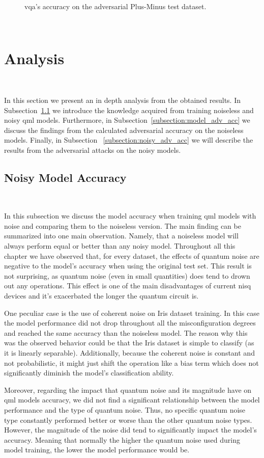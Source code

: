 \begin{figure}[!h]
  \caption{\ac{vqa}'s accuracy on the adversarial Plus-Minus test dataset.}
  \label{fig:pm-34}
\end{figure} \

\section{Analysis}\label{section:analysis} \

In this section we present an in depth analysis from the obtained
results. In Subsection~\ref{subsection:model_acc} we introduce
the knowledge acquired from training noiseless and noisy \ac{qml}
models. Furthermore, in Subsection~\ref{subsection:model_adv_acc}
we discuss the findings from the calculated adversarial accuracy
on the noiseless models. Finally, in Subsection
~\ref{subsection:noisy_adv_acc} we will describe the results
from the adversarial attacks on the noisy models. \

\subsection{Noisy Model Accuracy}\label{subsection:model_acc} \

In this subsection we discuss the model accuracy when training
\ac{qml} models with noise and comparing them to the noiseless
version. The main finding can be summarized into one main observation.
Namely, that a noiseless model will always perform equal or better
than any noisy model. Throughout all this chapter we have observed
that, for every dataset, the effects of quantum noise are negative
to the model's accuracy when using the original test set. This
result is not surprising, as quantum noise (even in small
quantities) does tend to drown out any operations. This effect
is one of the main disadvantages of current \ac{nisq} devices
and it's exacerbated the longer the quantum circuit is. \

One peculiar case is the use of coherent noise on Iris dataset
training. In this case the model performance did not drop
throughout all the misconfiguration degrees and reached the
same accuracy than the noiseless model. The reason why this
was the observed behavior could be that the Iris dataset is
simple to classify (as it is linearly separable). Additionally,
because the coherent noise is constant and not probabilistic,
it might just shift the operation like a bias term which does
not significantly diminish the model's classification ability. \

Moreover, regarding the impact that quantum noise and its
magnitude have on \ac{qml} models accuracy, we did not find
a significant relationship between the model performance
and the type of quantum noise. Thus, no specific quantum
noise type constantly performed better or worse than the
other quantum noise types. However, the magnitude of the
noise did tend to significantly impact the model's accuracy.
Meaning that normally the higher the quantum noise used
during model training, the lower the model performance would
be. \

